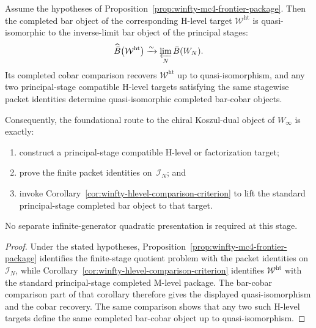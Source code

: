 \begin{corollary}
\label{cor:winfty-dual-candidate-construction}
Assume the hypotheses of
Proposition~\ref{prop:winfty-mc4-frontier-package}. Then the completed
bar object of the corresponding H-level target
$\mathcal{W}^{\mathrm{ht}}$ is quasi-isomorphic to the inverse-limit
bar object of the principal stages:
\[
\widehat{\bar B}\bigl(\mathcal{W}^{\mathrm{ht}}\bigr)
\xrightarrow{\sim}
\varprojlim_N \bar B(W_N).
\]
Its completed cobar comparison recovers
$\mathcal{W}^{\mathrm{ht}}$ up to quasi-isomorphism, and any two
principal-stage compatible H-level targets satisfying the same
stagewise packet identities determine quasi-isomorphic completed
bar-cobar objects.

Consequently, the foundational route to the chiral Koszul-dual object
of \texorpdfstring{$W_\infty$}{W_infty} is exactly:
\begin{enumerate}
\item construct a principal-stage compatible H-level or factorization
 target;
\item prove the finite packet identities on~$\mathcal{I}_N$; and
\item invoke
 Corollary~\ref{cor:winfty-hlevel-comparison-criterion} to lift the
 standard principal-stage completed bar object to that target.
\end{enumerate}
No separate infinite-generator quadratic presentation is required at
this stage.
\end{corollary}

\begin{proof}
Under the stated hypotheses,
Proposition~\ref{prop:winfty-mc4-frontier-package} identifies the
finite-stage quotient problem with the packet identities on
$\mathcal{I}_N$, while
Corollary~\ref{cor:winfty-hlevel-comparison-criterion} identifies
$\mathcal{W}^{\mathrm{ht}}$ with the standard principal-stage completed
M-level package. The bar-cobar comparison part of that corollary
therefore gives the displayed quasi-isomorphism and the cobar recovery.
The same comparison shows that any two such H-level targets define the
same completed bar-cobar object up to quasi-isomorphism.
\end{proof}

